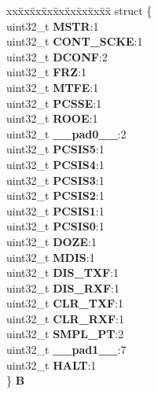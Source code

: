 \begin{DoxyCompactItemize}
\begin{tabbing}
\end{tabbing}\item 
\mbox{\label{unionDSPI__tag_1_1DSPI__MCR__tag_a04f22de9a20c8d1586ce2492d57c7368}} 
\begin{tabbing}
xx\=xx\=xx\=xx\=xx\=xx\=xx\=xx\=xx\=\kill
struct \{\\
\>uint32\_t {\bfseries MSTR}:1\\
\>uint32\_t {\bfseries CONT\_SCKE}:1\\
\>uint32\_t {\bfseries DCONF}:2\\
\>uint32\_t {\bfseries FRZ}:1\\
\>uint32\_t {\bfseries MTFE}:1\\
\>uint32\_t {\bfseries PCSSE}:1\\
\>uint32\_t {\bfseries ROOE}:1\\
\>uint32\_t {\bfseries \_\_pad0\_\_}:2\\
\>uint32\_t {\bfseries PCSIS5}:1\\
\>uint32\_t {\bfseries PCSIS4}:1\\
\>uint32\_t {\bfseries PCSIS3}:1\\
\>uint32\_t {\bfseries PCSIS2}:1\\
\>uint32\_t {\bfseries PCSIS1}:1\\
\>uint32\_t {\bfseries PCSIS0}:1\\
\>uint32\_t {\bfseries DOZE}:1\\
\>uint32\_t {\bfseries MDIS}:1\\
\>uint32\_t {\bfseries DIS\_TXF}:1\\
\>uint32\_t {\bfseries DIS\_RXF}:1\\
\>uint32\_t {\bfseries CLR\_TXF}:1\\
\>uint32\_t {\bfseries CLR\_RXF}:1\\
\>uint32\_t {\bfseries SMPL\_PT}:2\\
\>uint32\_t {\bfseries \_\_pad1\_\_}:7\\
\>uint32\_t {\bfseries HALT}:1\\
\} {\bfseries B}\\


\end{tabbing}
\end{DoxyCompactItemize}
